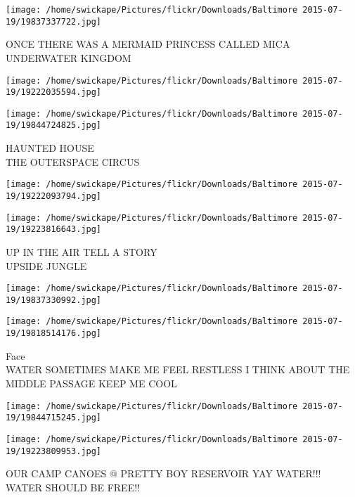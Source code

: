 \documentclass[10pt,letterpaper]{article}
\begin{document}
\vspace{0.25in}
\texttt{[image: /home/swickape/Pictures/flickr/Downloads/Baltimore 2015-07-19/19837337722.jpg]}

ONCE THERE WAS A MERMAID PRINCESS CALLED MICA\\
UNDERWATER KINGDOM\\
\pagebreak

\texttt{[image: /home/swickape/Pictures/flickr/Downloads/Baltimore 2015-07-19/19222035594.jpg]}

\vspace{0.25in}
\texttt{[image: /home/swickape/Pictures/flickr/Downloads/Baltimore 2015-07-19/19844724825.jpg]}

HAUNTED HOUSE\\
THE OUTERSPACE CIRCUS\\
\pagebreak

\texttt{[image: /home/swickape/Pictures/flickr/Downloads/Baltimore 2015-07-19/19222093794.jpg]}

\vspace{0.25in}
\texttt{[image: /home/swickape/Pictures/flickr/Downloads/Baltimore 2015-07-19/19223816643.jpg]}

UP IN THE AIR TELL A STORY\\
UPSIDE JUNGLE\\
\pagebreak

\texttt{[image: /home/swickape/Pictures/flickr/Downloads/Baltimore 2015-07-19/19837330992.jpg]}

\vspace{0.25in}
\texttt{[image: /home/swickape/Pictures/flickr/Downloads/Baltimore 2015-07-19/19818514176.jpg]}

Face\\
WATER SOMETIMES MAKE ME FEEL RESTLESS I THINK ABOUT THE MIDDLE PASSAGE KEEP ME COOL\\
\pagebreak

\texttt{[image: /home/swickape/Pictures/flickr/Downloads/Baltimore 2015-07-19/19844715245.jpg]}

\vspace{0.25in}
\texttt{[image: /home/swickape/Pictures/flickr/Downloads/Baltimore 2015-07-19/19223809953.jpg]}

OUR CAMP CANOES @ PRETTY BOY RESERVOIR YAY WATER!!!\\
WATER SHOULD BE FREE!!\\
\pagebreak
\end{document}
